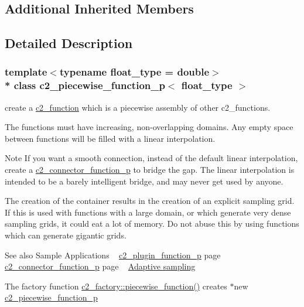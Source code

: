\subsection*{Additional Inherited Members}


\subsection{Detailed Description}
\subsubsection*{template$<$typename float\+\_\+type = double$>$\\*
class c2\+\_\+piecewise\+\_\+function\+\_\+p$<$ float\+\_\+type $>$}

create a \hyperlink{classc2__function}{c2\+\_\+function} which is a piecewise assembly of other c2\+\_\+functions.

The functions must have increasing, non-\/overlapping domains. Any empty space between functions will be filled with a linear interpolation. 

\begin{DoxyNote}{Note}
If you want a smooth connection, instead of the default linear interpolation, create a \hyperlink{classc2__connector__function__p}{c2\+\_\+connector\+\_\+function\+\_\+p} to bridge the gap. The linear interpolation is intended to be a barely intelligent bridge, and may never get used by anyone.

The creation of the container results in the creation of an explicit sampling grid. If this is used with functions with a large domain, or which generate very dense sampling grids, it could eat a lot of memory. Do not abuse this by using functions which can generate gigantic grids.
\end{DoxyNote}
\begin{DoxySeeAlso}{See also}
Sample Applications ~\newline
\hyperlink{classc2__plugin__function__p}{c2\+\_\+plugin\+\_\+function\+\_\+p} page ~\newline
\hyperlink{classc2__connector__function__p}{c2\+\_\+connector\+\_\+function\+\_\+p} page ~\newline
\hyperlink{classc2__function_aea75f73d6a97087571c163ae4e514652}{Adaptive sampling}
\end{DoxySeeAlso}
The factory function \hyperlink{classc2__factory_ae8073f403ae804870d8ce71e67175507}{c2\+\_\+factory\+::piecewise\+\_\+function()} creates $\ast$new \hyperlink{classc2__piecewise__function__p}{c2\+\_\+piecewise\+\_\+function\+\_\+p} 

